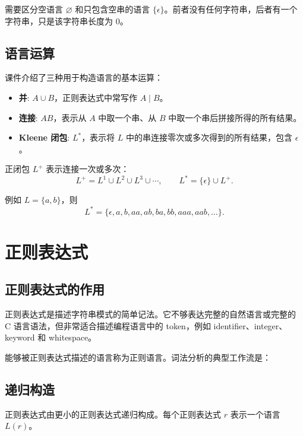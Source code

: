 \documentclass[11pt,a4paper]{article}
\begin{document}
需要区分空语言 $\varnothing$ 和只包含空串的语言 $\{\epsilon\}$。前者没有任何字符串，后者有一个字符串，只是该字符串长度为 $0$。

\subsection{语言运算}

课件介绍了三种用于构造语言的基本运算：

\begin{itemize}
  \item \textbf{并}: $A \cup B$，正则表达式中常写作 $A \mid B$。
  \item \textbf{连接}: $AB$，表示从 $A$ 中取一个串、从 $B$ 中取一个串后拼接所得的所有结果。
  \item \textbf{Kleene 闭包}: $L^*$，表示将 $L$ 中的串连接零次或多次得到的所有结果，包含 $\epsilon$。
\end{itemize}

正闭包 $L^+$ 表示连接一次或多次：
\[
L^+ = L^1 \cup L^2 \cup L^3 \cup \cdots,\qquad
L^* = \{\epsilon\} \cup L^+.
\]

例如 $L=\{a,b\}$，则
\[
L^*=\{\epsilon, a, b, aa, ab, ba, bb, aaa, aab, \ldots\}.
\]

\section{正则表达式}

\subsection{正则表达式的作用}

正则表达式是描述字符串模式的简单记法。它不够表达完整的自然语言或完整的 C 语言语法，但非常适合描述编程语言中的 token，例如 identifier、integer、keyword 和 whitespace。

能够被正则表达式描述的语言称为正则语言。词法分析的典型工作流是：

\begin{center}
\end{center}

\subsection{递归构造}

正则表达式由更小的正则表达式递归构成。每个正则表达式 $r$ 表示一个语言 $L(r)$。
\end{document}
